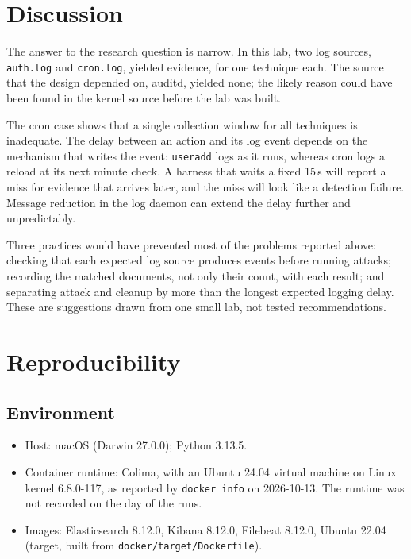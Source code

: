 \documentclass[11pt,a4paper]{article}
\begin{document}
\section{Discussion}

The answer to the research question is narrow. In this lab, two log sources,
\texttt{auth.log} and \texttt{cron.log}, yielded evidence, for one technique
each. The source that the design depended on, auditd, yielded none; the
likely reason could have been found in the kernel source before the lab was
built.

The cron case shows that a single collection window for all techniques is
inadequate. The delay between an action and its log event depends on the
mechanism that writes the event: \texttt{useradd} logs as it runs, whereas
cron logs a reload at its next minute check. A harness that waits a fixed
15\,s will report a miss for evidence that arrives later, and the miss will
look like a detection failure. Message reduction in the log daemon can extend
the delay further and unpredictably.

Three practices would have prevented most of the problems reported above:
checking that each expected log source produces events before running attacks;
recording the matched documents, not only their count, with each result; and
separating attack and cleanup by more than the longest expected logging delay.
These are suggestions drawn from one small lab, not tested recommendations.

\section{Reproducibility}
\label{sec:repro}

\subsection{Environment}

\begin{itemize}
    \item Host: macOS (Darwin 27.0.0); Python 3.13.5.
    \item Container runtime: Colima, with an Ubuntu 24.04 virtual machine on
    Linux kernel 6.8.0-117, as reported by \texttt{docker info} on 2026-10-13.
    The runtime was not recorded on the day of the runs.
    \item Images: Elasticsearch 8.12.0, Kibana 8.12.0, Filebeat 8.12.0,
    Ubuntu 22.04 (target, built from \texttt{docker/target/Dockerfile}).
\end{itemize}
\end{document}
